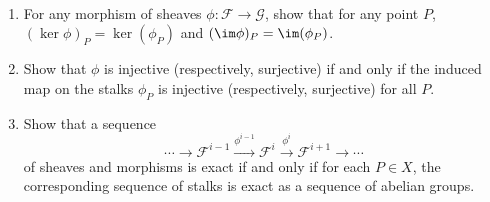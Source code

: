 \begin{exercise}%
	~
	\begin{enumerate}
		\item For any morphism of sheaves $\phi: \mathscr{F}\to \mathscr{G} $, show that for any point $P $, $(\ker \phi)_P = \ker(\phi_P) $ and $(\im \phi)_P = \im(\phi_P) $.
		\item Show that $\phi $ is injective (respectively, surjective) if and only if the induced map on the stalks $\phi_P $ is injective (respectively, surjective) for all $P $.
		\item Show that a sequence
			\[
				\cdots \to \mathscr{F}^{i-1}\xrightarrow{\phi ^{i-1}} \mathscr{F}^i \xrightarrow{\phi^i} \mathscr{F}^{i+1}\to \cdots
			\]
			of sheaves and morphisms is exact if and only if for each $P \in X $, the corresponding sequence of stalks is exact as a sequence of abelian groups.
	\end{enumerate}
\end{exercise}

